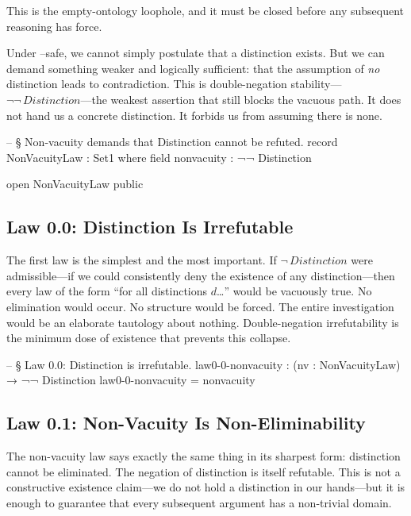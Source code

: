 \documentclass[11pt,a4paper]{book}
\def\texttt#1{#1}%
\begin{document}
This is the empty-ontology loophole, and it must be closed before any subsequent reasoning has force.

Under \texttt{--safe}, we cannot simply postulate that a distinction exists. But we can demand something weaker and logically sufficient: that the assumption of \textit{no} distinction leads to contradiction. This is double-negation stability—$\neg\neg\,\mathit{Distinction}$—the weakest assertion that still blocks the vacuous path. It does not hand us a concrete distinction. It forbids us from assuming there is none.

\begin{code}
-- § Non-vacuity demands that Distinction cannot be refuted.
record NonVacuityLaw : Set1 where
  field
    nonvacuity : ¬¬ Distinction

open NonVacuityLaw public
\end{code}

\subsection{Law 0.0: Distinction Is Irrefutable}

The first law is the simplest and the most important. If $\neg\,\mathit{Distinction}$ were admissible—if we could consistently deny the existence of any distinction—then every law of the form ``for all distinctions $d$\ldots'' would be vacuously true. No elimination would occur. No structure would be forced. The entire investigation would be an elaborate tautology about nothing. Double-negation irrefutability is the minimum dose of existence that prevents this collapse.

\begin{code}
-- § Law 0.0: Distinction is irrefutable.
law0-0-nonvacuity : (nv : NonVacuityLaw) → ¬¬ Distinction
law0-0-nonvacuity = nonvacuity
\end{code}

\subsection{Law 0.1: Non-Vacuity Is Non-Eliminability}

The non-vacuity law says exactly the same thing in its sharpest form: distinction cannot be eliminated. The negation of distinction is itself refutable. This is not a constructive existence claim—we do not hold a distinction in our hands—but it is enough to guarantee that every subsequent argument has a non-trivial domain.
\end{document}

